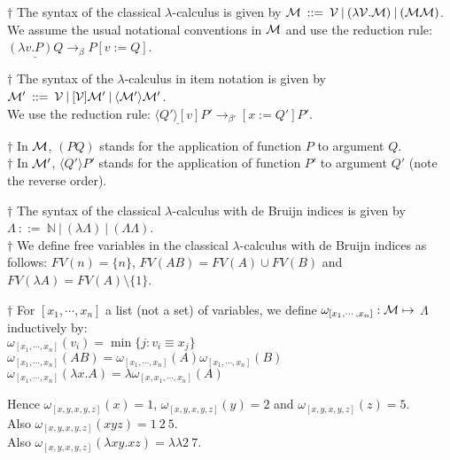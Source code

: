 \documentclass[11pt]{article}
\begin{document}
$\dagger$ The syntax of the classical $\lambda$-calculus is given by
${\cal M}  \: ::=  \:  {\cal V} \:|\: ( \lambda{{\cal V}}.{{\cal M}}) \:|\: ( {\cal M} {\cal M})$.\\
We assume the usual notational conventions in ${\cal M}$ and use 
the reduction rule: \\$\underline{(\lambda v. P)Q} \rightarrow_\beta P[v:=Q]$.

$\dagger$ The syntax of the  $\lambda$-calculus in item notation is given by
${\cal M}'  \: ::=  \:  {\cal V} \:|\: [{\cal V}]{\cal M}' \:|\: \langle{\cal M}'\rangle{\cal M}'$.\\
We use the reduction rule: 
$ \underline{\langle Q'\rangle[v]}P' \rightarrow_{\beta'} [x:=Q']P'$.

$\dagger$ In ${\cal M}$, $(PQ)$ stands for the application of function $P$ to argument $Q$.\\
$\dagger$ In ${\cal M}'$, $\langle Q'\rangle P'$ stands for the application of function $P'$ to argument $Q'$ (note the reverse order).

$\dagger$ The syntax of the classical $\lambda$-calculus with de Bruijn indices is given by\\
$\Lambda  \: ::=  \:  {\mathbb{N}} \:|\: ( \lambda{}{\Lambda}) \:|\: ( \Lambda \Lambda)$.\\

$\dagger$ We define free variables in 
the classical $\lambda$-calculus with de Bruijn indices as follows:
$FV(n) = \{n\}$, $FV(AB) = FV(A)\cup FV(B)$ and $FV(\lambda A) = FV(A)\setminus\{1\}$.

$\dagger$  For $[x_1,\cdots, x_n]$ a list (not a set) of variables, 
we define $\omega_{[x_1,\cdots, x_n]}: {\cal M} \mapsto$ $\Lambda$ inductively by:\\
$\omega_{[x_1,\cdots, x_n]}(v_i) = \min\{j:v_i \equiv x_j\}$\\
$\omega_{[x_1,\cdots, x_n]}(AB) = \omega_{[x_1,\cdots, x_n]}(A)\omega_{[x_1,\cdots, x_n]}(B)$\\
$\omega_{[x_1,\cdots, x_n]}(\lambda x.A)= \lambda \omega_{[x,x_1,\cdots, x_n]}(A)$

Hence $\omega_{[x, y, x,y,z]}(x) = 1$, $\omega_{[x, y, x,y,z]}(y) = 2$ and $\omega_{[x, y, x,y,z]}(z) = 5$.\\
Also $\omega_{[x, y, x,y,z]}(xyz) = 1\:2\:5$.\\
Also $\omega_{[x, y, x,y,z]}(\lambda xy.xz) = \lambda \lambda 2\:7$.\\
\end{document}
